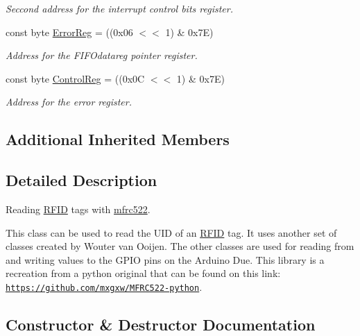 \begin{DoxyCompactItemize}
\begin{DoxyCompactList}\small\item\em Seccond address for the interrupt control bits register. \end{DoxyCompactList}\item 
const byte \hyperlink{classmfrc522_a91f4e4c517d9f583250a6f5b022c590d}{Error\+Reg} = ((0x06 $<$$<$ 1) \& 0x7\+E)\hypertarget{classmfrc522_a91f4e4c517d9f583250a6f5b022c590d}{}\label{classmfrc522_a91f4e4c517d9f583250a6f5b022c590d}

\begin{DoxyCompactList}\small\item\em Address for the F\+I\+F\+Odatareg pointer register. \end{DoxyCompactList}\item 
const byte \hyperlink{classmfrc522_ad2e13b4fb8a39ed0200b467666266346}{Control\+Reg} = ((0x0\+C $<$$<$ 1) \& 0x7\+E)\hypertarget{classmfrc522_ad2e13b4fb8a39ed0200b467666266346}{}\label{classmfrc522_ad2e13b4fb8a39ed0200b467666266346}

\begin{DoxyCompactList}\small\item\em Address for the error register. \end{DoxyCompactList}\end{DoxyCompactItemize}
\subsection*{Additional Inherited Members}


\subsection{Detailed Description}
Reading \hyperlink{class_r_f_i_d}{R\+F\+ID} tags with \hyperlink{classmfrc522}{mfrc522}. 

This class can be used to read the U\+ID of an \hyperlink{class_r_f_i_d}{R\+F\+ID} tag. It uses another set of classes created by Wouter van Ooijen. The other classes are used for reading from and writing values to the G\+P\+IO pins on the Arduino Due. This library is a recreation from a python original that can be found on this link\+: \href{https://github.com/mxgxw/MFRC522-python}{\tt https\+://github.\+com/mxgxw/\+M\+F\+R\+C522-\/python}. 

\subsection{Constructor \& Destructor Documentation}
